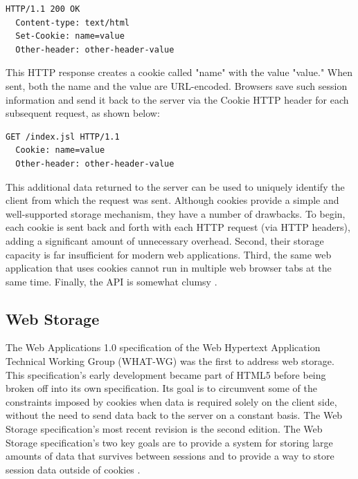 \begin{lstlisting}[language={}]
  HTTP/1.1 200 OK
  Content-type: text/html
  Set-Cookie: name=value
  Other-header: other-header-value
\end{lstlisting}

This HTTP response creates a cookie called "name" with the value "value." When sent, both the name and the value are URL-encoded. Browsers save such session information and send it back to the server via the Cookie HTTP header for each subsequent request, as shown below:

\begin{lstlisting}[language={}]
  GET /index.jsl HTTP/1.1
  Cookie: name=value
  Other-header: other-header-value
\end{lstlisting}

This additional data returned to the server can be used to uniquely identify the client from which the request was sent. Although cookies provide a simple and well-supported storage mechanism, they have a number of drawbacks. To begin, each cookie is sent back and forth with each HTTP request (via HTTP headers), adding a significant amount of unnecessary overhead. Second, their storage capacity is far insufficient for modern web applications. Third, the same web application that uses cookies cannot run in multiple web browser tabs at the same time. Finally, the API is somewhat clumsy \autocite{kessin2011programming, macdonald2013html5}.

\subsection*{Web Storage}
The Web Applications 1.0 specification of the Web Hypertext Application Technical Working Group (WHAT-WG) was the first to address web storage. This specification's early development became part of HTML5 before being broken off into its own specification. Its goal is to circumvent some of the constraints imposed by cookies when data is required solely on the client side, without the need to send data back to the server on a constant basis. The Web Storage specification's most recent revision is the second edition. The Web Storage specification's two key goals are to provide a system for storing large amounts of data that survives between sessions and to provide a way to store session data outside of cookies \autocite{frisbie2019professional}.

